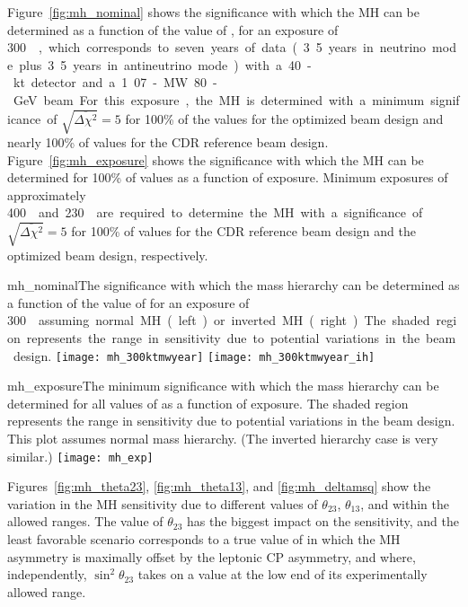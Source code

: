 Figure~\ref{fig:mh_nominal} shows the significance with which the MH
can be determined as a function of the value of \deltacp, for an
exposure of \SI{300}~\ktMWyr, which corresponds to seven years of data
(3.5 years in neutrino mode plus 3.5 years in antineutrino mode) with
a 40-kt detector and a 1.07-MW 80-GeV beam.  For this exposure, the MH is
determined with a minimum significance of
$\sqrt{\overline{\Delta\chi^{2}}} = 5$ for 100\% of the \deltacp
values for the optimized beam design and nearly 100\% of \deltacp
values for the CDR reference beam design.
Figure~\ref{fig:mh_exposure} shows the significance with which the MH
can be determined for 100\% of \deltacp values as a function of
exposure.  Minimum exposures of approximately \SI{400}~\ktMWyr{} and
\SI{230}~\ktMWyr{} are required to determine the MH with a significance of
$\sqrt{\overline{\Delta\chi^2}} = 5$ for 100\% of \deltacp values for
the CDR reference beam design and the optimized beam design,
respectively.

\begin{cdrfigure}{mh_nominal}{The significance with which the mass hierarchy can be determined as a function of the value of \deltacp for an exposure of \SI{300}~\ktMWyr{} assuming normal MH (left) or inverted MH (right).  The shaded region represents the range in sensitivity due to potential variations in the beam design.}
 \texttt{[image: mh\_300ktmwyear]}
 \texttt{[image: mh\_300ktmwyear\_ih]}
\end{cdrfigure}

\begin{cdrfigure}{mh_exposure}{The minimum significance with which the mass hierarchy can be determined for all values of \deltacp as a function of exposure.  The shaded region represents the range in sensitivity due to potential variations in the beam design. This plot assumes normal mass hierarchy. (The inverted hierarchy case is very similar.)}
 \texttt{[image: mh\_exp]}
\end{cdrfigure}

Figures~\ref{fig:mh_theta23}, \ref{fig:mh_theta13}, and
\ref{fig:mh_deltamsq} show the variation in the MH sensitivity due to
different values of $\theta_{23}$, $\theta_{13}$, and  within
the allowed ranges.  The value of $\theta_{23}$ has the biggest impact
on the sensitivity, and the least favorable scenario corresponds to a
true value of \deltacp in which the MH asymmetry is maximally offset
by the leptonic CP asymmetry, and where, independently,
$\sin^2{\theta_{23}}$ takes on a value at the low end of its
experimentally allowed range.

